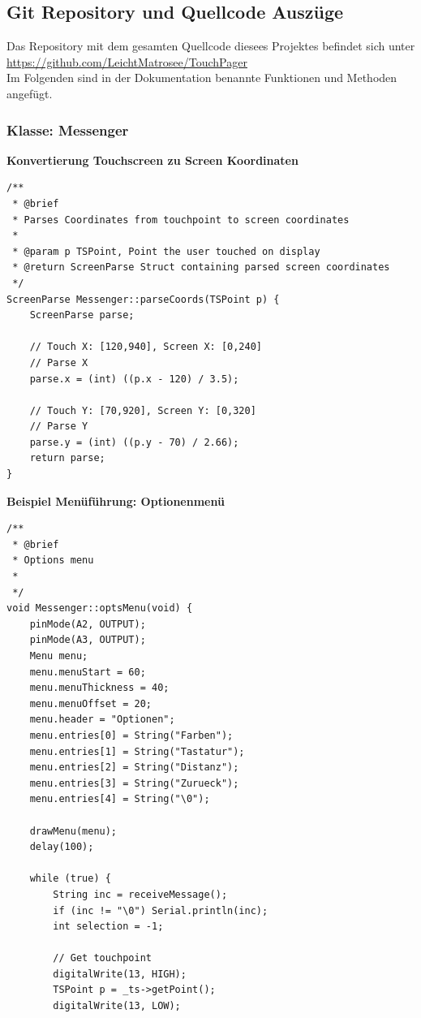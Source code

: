 \documentclass[a4paper, 11pt]{scrartcl}
\begin{document}
\begin{small}
\newpage
\subsection{Git Repository und Quellcode Auszüge}\label{ch:codeschnipsel}
Das Repository mit dem gesamten Quellcode diesees Projektes befindet sich unter
\\
\url{https://github.com/LeichtMatrosee/TouchPager}
\\
Im Folgenden sind in der Dokumentation benannte Funktionen und Methoden angefügt.

\subsubsection{Klasse: Messenger}
\textbf{Konvertierung Touchscreen zu Screen Koordinaten}\label{code:screenparse}
\begin{lstlisting}
/**
 * @brief 
 * Parses Coordinates from touchpoint to screen coordinates
 * 
 * @param p TSPoint, Point the user touched on display
 * @return ScreenParse Struct containing parsed screen coordinates
 */
ScreenParse Messenger::parseCoords(TSPoint p) {
    ScreenParse parse;
    
    // Touch X: [120,940], Screen X: [0,240]
    // Parse X
    parse.x = (int) ((p.x - 120) / 3.5);

    // Touch Y: [70,920], Screen Y: [0,320]
    // Parse Y
    parse.y = (int) ((p.y - 70) / 2.66);
    return parse;
}
\end{lstlisting}

\begin{flushleft}\textbf{Beispiel Menüführung: Optionenmenü}\end{flushleft}
\begin{lstlisting}
/**
 * @brief 
 * Options menu
 * 
 */
void Messenger::optsMenu(void) {
    pinMode(A2, OUTPUT);
    pinMode(A3, OUTPUT);
    Menu menu;
    menu.menuStart = 60;
    menu.menuThickness = 40;
    menu.menuOffset = 20;
    menu.header = "Optionen";
    menu.entries[0] = String("Farben");
    menu.entries[1] = String("Tastatur");
    menu.entries[2] = String("Distanz");
    menu.entries[3] = String("Zurueck");
    menu.entries[4] = String("\0");

    drawMenu(menu);
    delay(100);

    while (true) {
        String inc = receiveMessage();
        if (inc != "\0") Serial.println(inc);
        int selection = -1;
        
        // Get touchpoint
        digitalWrite(13, HIGH);
        TSPoint p = _ts->getPoint();
        digitalWrite(13, LOW);


\end{lstlisting}
\end{small}
\end{document}
